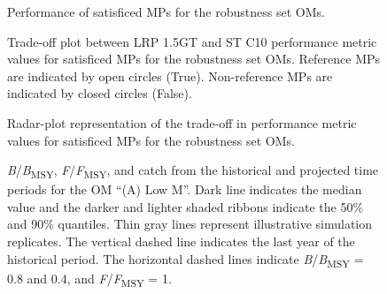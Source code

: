 \documentclass[11pt]{book}
\begin{document}
\begin{figure}[htb]

{\centering {} 

}

\caption{Performance of satisficed MPs for the robustness set OMs.}\label{fig:tigure-panel-rob}
\end{figure}
\begin{figure}[htb]

{\centering {} 

}

\caption{Trade-off plot between LRP 1.5GT and ST C10 performance metric values for satisficed MPs for the robustness set OMs. Reference MPs are indicated by open circles (True). Non-reference MPs are indicated by closed circles (False).}\label{fig:tradeoff-robust}
\end{figure}
\begin{figure}[htb]

{\centering {} 

}

\caption{Radar-plot representation of the trade-off in performance metric values for satisficed MPs for the robustness set OMs.}\label{fig:spider-satisficed-mps-robust}
\end{figure}

\begin{figure}[htb]

{\centering {} 

}

\caption{\emph{B}/\emph{B}\textsubscript{MSY}, \emph{F}/\emph{F}\textsubscript{MSY}, and catch from the historical and projected time periods for the OM ``(A) Low M''. Dark line indicates the median value and the darker and lighter shaded ribbons indicate the 50\% and 90\% quantiles. Thin gray lines represent illustrative simulation replicates. The vertical dashed line indicates the last year of the historical period. The horizontal dashed lines indicate \emph{B}/\emph{B}\textsubscript{MSY} = 0.8 and 0.4, and \emph{F}/\emph{F}\textsubscript{MSY} = 1.}\label{fig:proj-low-m}
\end{figure}
\end{document}
